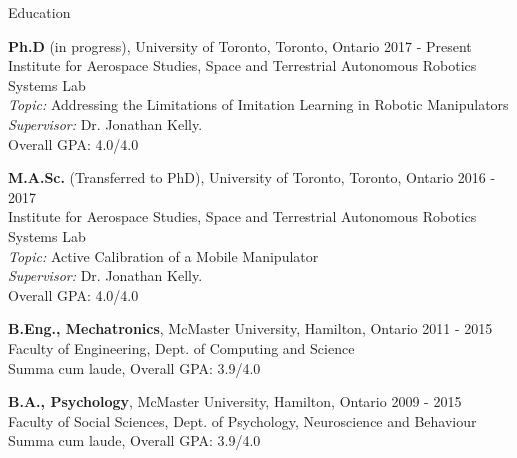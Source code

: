 \documentclass[usenames, dvipsnames]{resume} %
\begin{document}
	




% 
%


\begin{rSection}{Education}

\textbf{Ph.D} (in progress), University of Toronto, Toronto, Ontario \hfill {2017 - Present} \\
Institute for Aerospace Studies, Space and Terrestrial Autonomous Robotics Systems Lab \smallskip \\
\textit{Topic:} Addressing the Limitations of Imitation Learning in Robotic Manipulators \\
\textit{Supervisor:} Dr. Jonathan Kelly. \smallskip \\
Overall GPA: 4.0/4.0

\textbf{M.A.Sc.} (Transferred to PhD), University of Toronto, Toronto, Ontario \hfill {2016 - 2017} \\
Institute for Aerospace Studies, Space and Terrestrial Autonomous Robotics Systems Lab \smallskip \\
\textit{Topic:} Active Calibration of a Mobile Manipulator \\
\textit{Supervisor:} Dr. Jonathan Kelly. \smallskip \\
Overall GPA: 4.0/4.0

\textbf{B.Eng., Mechatronics}, McMaster University, Hamilton, Ontario \hfill {2011 - 2015} \\
Faculty of Engineering, Dept. of Computing and Science \smallskip \\
Summa cum laude, Overall GPA: 3.9/4.0

\textbf{B.A., Psychology}, McMaster University, Hamilton, Ontario \hfill {2009 - 2015} \\
Faculty of Social Sciences, Dept. of Psychology, Neuroscience and Behaviour \smallskip \\
Summa cum laude, Overall GPA: 3.9/4.0

\end{rSection}
\end{document}
